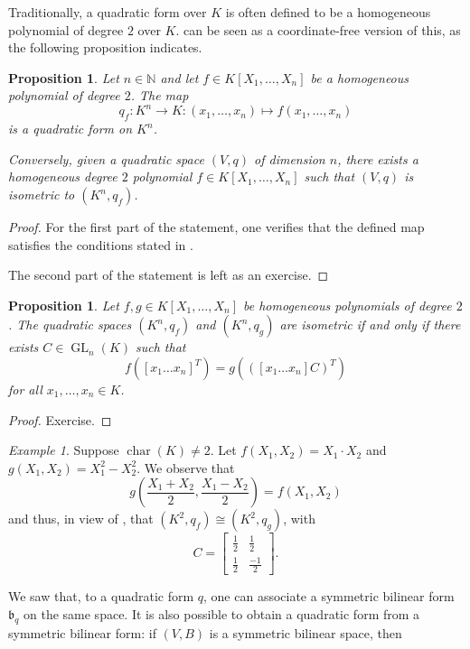 \documentclass[12pt, leqno, british]{amsart}
\theoremstyle{definition}
\theoremstyle{plain}
\newtheorem{prop}[defi]{Proposition}
\theoremstyle{remark}
\newtheorem{eg}[defi]{Example}
\newcommand{\mf}{\mathfrak}
\newcommand{\mbb}{\mathbb}
\newcommand{\nat}{\mbb N}
\DeclareMathOperator{\charac}{char}
\DeclareMathOperator{\GL}{GL}
\begin{document}
Traditionally, a quadratic form over $K$ is often defined to be a homogeneous polynomial of degree $2$ over $K$.
 can be seen as a coordinate-free version of this, as the following proposition indicates.
\begin{prop}\label{P:QF-coordinates}
Let $n \in \nat$ and let $f \in K[X_1, \ldots, X_n]$ be a homogeneous polynomial of degree $2$. The map
$$ q_f : K^n \to K : (x_1, \ldots, x_n) \mapsto f(x_1, \ldots, x_n)$$
is a quadratic form on $K^n$.

Conversely, given a quadratic space $(V, q)$ of dimension $n$, there exists a homogeneous degree $2$ polynomial $f \in K[X_1, \ldots, X_n]$ such that $(V, q)$ is isometric to $(K^n, q_f)$.
\end{prop}
\begin{proof}
For the first part of the statement, one verifies that the defined map satisfies the conditions stated in .

The second part of the statement is left as an exercise.
\end{proof}
\begin{prop}\label{P:isometric-coordinate}
Let $f, g \in K[X_1, \ldots, X_n]$ be homogeneous polynomials of degree $2$.
The quadratic spaces $(K^n, q_f)$ and $(K^n, q_g)$ are isometric if and only if there exists $C \in \GL_n(K)$ such that
$$ f\left(\left[ x_1 \ldots x_n \right]^T\right) = g\left((\left[ x_1 \ldots x_n\right] C)^T\right)$$
for all $x_1, \ldots, x_n \in K$.
\end{prop}
\begin{proof}
Exercise.
\end{proof}
\begin{eg}\label{E:hyperbolic-plane-isometry}
Suppose $\charac(K) \neq 2$. Let $f(X_1, X_2) = X_1 \cdot X_2$ and $g(X_1, X_2) = X_1^2 - X_2^2$.
We observe that
$$ g\left(\frac{X_1 + X_2}{2}, \frac{X_1 - X_2}{2}\right) = f(X_1, X_2) $$
and thus, in view of , that $(K^2, q_f) \cong (K^2, q_g)$, with
\begin{displaymath}
C = \begin{bmatrix}
\frac{1}{2} & \frac{1}{2} \\ \frac{1}{2} & \frac{-1}{2}
\end{bmatrix}.
\end{displaymath}
\end{eg}
We saw that, to a quadratic form $q$, one can associate a symmetric bilinear form $\mf{b}_q$ on the same space.
It is also possible to obtain a quadratic form from a symmetric bilinear form: if $(V, B)$ is a symmetric bilinear space, then
\end{document}
